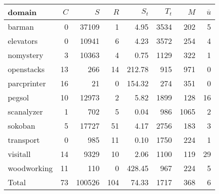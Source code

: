 \begin{table}[htbp]
\centering
\begingroup\small
\begin{tabular}{lrrrrrrr}
  \hline
domain & $C$ & $S$ & $R$ & $S_t$ & $T_t$ & $M$ & $\overline{u}$ \\ 
  \hline
barman &   0 & 37109 &   1 & 4.95 & 3534 & 202 &   5 \\ 
  elevators &   0 & 10941 &   6 & 4.23 & 3572 & 254 &   4 \\ 
  nomystery &   3 & 10363 &   4 & 0.75 & 1129 & 322 &   1 \\ 
  openstacks &  13 & 266 &  14 & 212.78 & 915 & 971 &   0 \\ 
  parcprinter &  16 &  21 &   0 & 154.32 & 274 & 351 &   0 \\ 
  pegsol &  10 & 12973 &   2 & 5.82 & 1899 & 128 &  16 \\ 
  scanalyzer &   1 & 702 &   5 & 0.04 & 986 & 1065 &   2 \\ 
  sokoban &   5 & 17727 &  51 & 4.17 & 2756 & 183 &   3 \\ 
  transport &   0 & 985 &  11 & 0.10 & 1750 & 224 &   1 \\ 
  visitall &  14 & 9329 &  10 & 2.06 & 1100 & 119 &  29 \\ 
  woodworking &  11 & 110 &   0 & 428.45 & 967 & 224 &   5 \\ 
  Total &  73 & 100526 & 104 & 74.33 & 1717 & 368 &   6 \\ 
   \hline
\end{tabular}
\endgroup
\caption{\oursolver{}} 
\label{tab:our}
\end{table}
